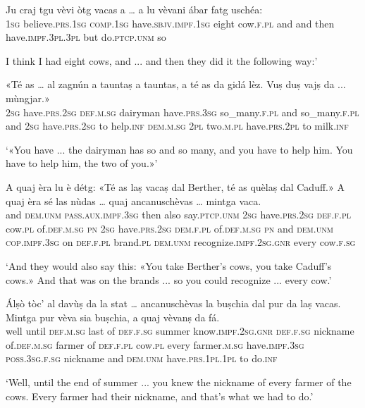 	\begin{linenumbers}
\gll	Ju craj tgu vèvi òtg vacas a … a lu vèvani ábar fatg uschéa:\\
 \textsc{1sg} believe.\textsc{prs.1sg} \textsc{comp.1sg} have.\textsc{sbjv.impf.1sg} eight cow.\textsc{f.pl} and {} and then have.\textsc{impf.3pl.3pl} but  do.\textsc{ptcp.unm} so\\
\end{linenumbers}
\medskip
\glt  I think I had eight cows, and ... and then they did it the following way:'
\medskip

\begin{linenumbers}
	\gll «Té as … al zagnún a tauntaṣ a tauntas, a té as da gidá lèz. Vuṣ duṣ vajṣ da ... mùngjar.»\\
	\textsc{2sg} have.\textsc{prs.2sg} {} \textsc{def.m.sg} dairyman have\textsc{.prs.3sg} so\_many.\textsc{f.pl} and so\_many.\textsc{f.pl} and \textsc{2sg} have.\textsc{prs.2sg} to help.\textsc{inf} \textsc{dem.m.sg} \textsc{2pl} two.\textsc{m.pl} have.\textsc{prs.2pl} to {} milk.\textsc{inf}\\
\end{linenumbers}
\medskip
	\glt `«You have ... the dairyman has so and so many, and you have to help him. You have to help him, the two of you.»'
\medskip

\begin{linenumbers}
	\gll A quaj èra lu è détg: «Té as laṣ vacaṣ dal Berther, té as quèlaṣ dal Caduff.» A quaj èra sé las nùdas … quaj ancanuschèvas … mintga vaca.\\
	and \textsc{dem.unm} \textsc{pass.aux.impf.3sg} then also say.\textsc{ptcp.unm} \textsc{2sg} have.\textsc{prs.2sg} \textsc{def.f.pl} cow.\textsc{pl} of.\textsc{def.m.sg} \textsc{pn} \textsc{2sg} have.\textsc{prs.2sg} \textsc{dem.f.pl} of.\textsc{def.m.sg} \textsc{pn} and \textsc{dem.unm} \textsc{cop.impf.3sg} on \textsc{def.f.pl} brand.\textsc{pl} {} \textsc{dem.unm} recognize.\textsc{impf.2sg.gnr} {} every cow.\textsc{f.sg}\\
\end{linenumbers}
\medskip
\glt `And they would also say this: «You take Berther's cows, you take Caduff's cows.» And that was on the brands ... so you could recognize ... every cow.'
\medskip

\begin{linenumbers}
	\gll Álṣò tòc’ al davùṣ da la stat … ancanuschèvas la buṣchia dal pur da laṣ vacas. Mintga pur vèva sia buṣchia, a quaj vèvanṣ da fá.\\
	well until \textsc{def.m.sg} last of \textsc{def.f.sg} summer {} know.\textsc{impf.2sg.gnr} \textsc{def.f.sg} nickname of.\textsc{def.m.sg} farmer of \textsc{def.f.pl} cow.\textsc{pl} every farmer.\textsc{m.sg} have.\textsc{impf.3sg} \textsc{poss.3sg.f.sg} nickname and \textsc{dem.unm} have.\textsc{prs.1pl.1pl} to do.\textsc{inf}\\
\end{linenumbers}
\medskip
\glt `Well, until the end of summer ... you knew the nickname of every farmer of the cows. Every farmer had their nickname, and that's what we had to do.'
\medskip

